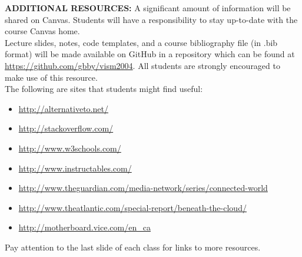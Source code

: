 \documentclass[10pt]{article}
\begin{document}
\textbf{ADDITIONAL RESOURCES:}
A significant amount of information will be shared on Canvas. Students will have a responsibility to stay up-to-date with the course Canvas home.\\ 
Lecture slides, notes, code templates, and a course bibliography file (in .bib format) will be made available on GitHub in a repository which can be found at \url{https://github.com/gbby/vism2004}. All students are strongly encouraged to make use of this resource.\\
The following are sites that students might find useful:
 \begin{itemize}[noitemsep,nolistsep]
 	\item \url{http://alternativeto.net/}
 	\item \url{http://stackoverflow.com/}
 	\item \url{http://www.w3schools.com/}
 	\item \url{http://www.instructables.com/}
 	\item \url{http://www.theguardian.com/media-network/series/connected-world}
 	\item \url{http://www.theatlantic.com/special-report/beneath-the-cloud/}
 	\item \url{http://motherboard.vice.com/en_ca}
 \end{itemize}
Pay attention to the last slide of each class for links to more resources. 
\end{document}
